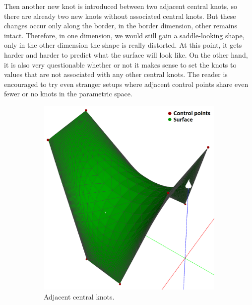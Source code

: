 \documentclass{article}
\begin{document}
Then another new knot is introduced between two adjacent central knots, so there are already two new knots without associated central knots. But these changes occur only along the border, in the border dimension, other remains intact. Therefore, in one dimension, we would still gain a saddle-looking shape, only in the other dimension the shape is really distorted. At this point, it gets harder and harder to predict what the surface will look like. On the other hand, it is also very questionable whether or not it makes sense to set the knots to values that are not associated with any other central knots. The reader is encouraged to try even stranger setups where adjacent control points share even fewer or no knots in the parametric space.

\begin{figure}[H]
\centering
\begin{subfigure}[b]{0.32\textwidth}
\includegraphics[width=\textwidth]{saddle6a}
\caption{Adjacent central knots.}
\label{saddle6a}
\end{subfigure}
\begin{subfigure}[b]{0.32\textwidth}

\end{subfigure}
\end{figure}
\end{document}
